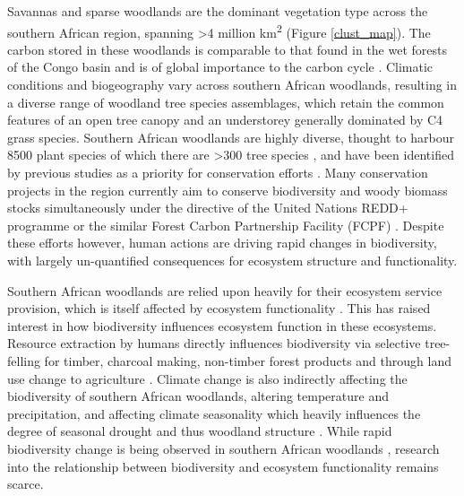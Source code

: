 \documentclass[11pt,a4paper]{article}
\begin{document}
Savannas and sparse woodlands are the dominant vegetation type across the southern African region, spanning >4 million km\textsuperscript{2} \citep{Ryan2016} (Figure \autoref{clust_map}). The carbon stored in these woodlands is comparable to that found in the wet forests of the Congo basin and is of global importance to the carbon cycle \citep{Houghton2009, Mayaux2008}. Climatic conditions and biogeography vary across southern African woodlands, resulting in a diverse range of woodland tree species assemblages, which retain the common features of an open tree canopy and an understorey generally dominated by C4 grass species. Southern African woodlands are highly diverse, thought to harbour \textapprox{}8500 plant species of which there are >300 tree species \citep{Frost1996}, and have been identified by previous studies as a priority for conservation efforts \citep{Byers2001, Mittermeier2003}. Many conservation projects in the region currently aim to conserve biodiversity and woody biomass stocks simultaneously under the directive of the United Nations REDD+ programme or the similar Forest Carbon Partnership Facility (FCPF) \citep{Hinsley2015}. Despite these efforts however, human actions are driving rapid changes in biodiversity, with largely un-quantified consequences for ecosystem structure and functionality.

Southern African woodlands are relied upon heavily for their ecosystem service provision, which is itself affected by ecosystem functionality \citep{Schulze1994}. This has raised interest in how biodiversity influences ecosystem function in these ecosystems. Resource extraction by humans directly influences biodiversity via selective tree-felling for timber, charcoal making, non-timber forest products and through land use change to agriculture \citep{Aleman2016, Ryan2016}. Climate change is also indirectly affecting the biodiversity of southern African woodlands, altering temperature and precipitation, and affecting climate seasonality which heavily influences the degree of seasonal drought and thus woodland structure \citep{Scholes2004, Eldridge2012}. While rapid biodiversity change is being observed in southern African woodlands \citep{Syampungani2009}, research into the relationship between biodiversity and ecosystem functionality remains scarce.
\end{document}
